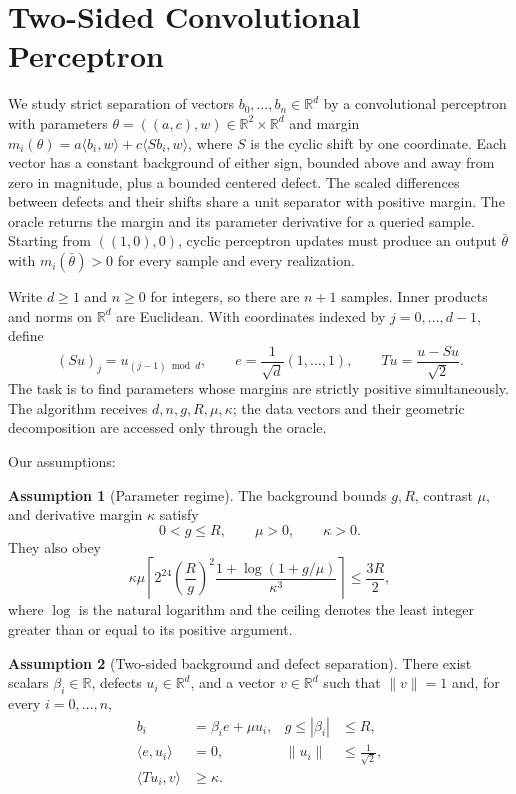 \documentclass[10pt]{article}
\theoremstyle{definition}
\newtheorem{assumption}{Assumption}
\begin{document}
\section*{Two-Sided Convolutional Perceptron}
We study strict separation of vectors $b_0,\ldots,b_n\in\mathbb{R}^d$ by a convolutional perceptron with parameters $\theta=((a,c),w)\in\mathbb{R}^2\times\mathbb{R}^d$ and margin $m_i(\theta)=a\langle b_i,w\rangle+c\langle Sb_i,w\rangle$, where $S$ is the cyclic shift by one coordinate. Each vector has a constant background of either sign, bounded above and away from zero in magnitude, plus a bounded centered defect. The scaled differences between defects and their shifts share a unit separator with positive margin. The oracle returns the margin and its parameter derivative for a queried sample. Starting from $((1,0),0)$, cyclic perceptron updates must produce an output $\bar\theta$ with $m_i(\bar\theta)>0$ for every sample and every realization.

Write $d\geq1$ and $n\geq0$ for integers, so there are $n+1$ samples. Inner products and norms on $\mathbb{R}^d$ are Euclidean. With coordinates indexed by $j=0,\ldots,d-1$, define
\[
(Su)_j=u_{(j-1)\bmod d},\qquad
 e=\frac{1}{\sqrt d}(1,\ldots,1),\qquad
 Tu=\frac{u-Su}{\sqrt2}.
\]
The task is to find parameters whose margins are strictly positive simultaneously. The algorithm receives $d,n,g,R,\mu,\kappa$; the data vectors and their geometric decomposition are accessed only through the oracle.

Our assumptions:
\begin{assumption}[Parameter regime]
The background bounds $g,R$, contrast $\mu$, and derivative margin $\kappa$ satisfy
\[
0<g\leq R,\qquad \mu>0,\qquad \kappa>0.
\]
They also obey
\[
\kappa\mu
\left\lceil
2^{24}\left(\frac{R}{g}\right)^2
\frac{1+\log(1+g/\mu)}{\kappa^3}
\right\rceil
\leq \frac{3R}{2},
\]
where $\log$ is the natural logarithm and the ceiling denotes the least integer greater than or equal to its positive argument.
\end{assumption}

\begin{assumption}[Two-sided background and defect separation]
There exist scalars $\beta_i\in\mathbb{R}$, defects $u_i\in\mathbb{R}^d$, and a vector $v\in\mathbb{R}^d$ such that $\|v\|=1$ and, for every $i=0,\ldots,n$,
\[
\begin{aligned}
b_i&=\beta_i e+\mu u_i, & g\leq |\beta_i|&\leq R,\\
\langle e,u_i\rangle&=0, & \|u_i\|&\leq\frac{1}{\sqrt2},\\
\langle Tu_i,v\rangle&\geq\kappa.
\end{aligned}
\]
\end{assumption}
\end{document}
